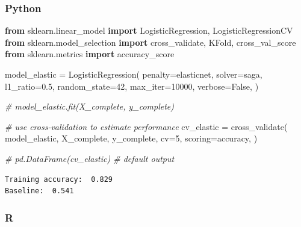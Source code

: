 \documentclass[
  letterpaper,
]{krantz}
\newenvironment{Shaded}{}{}
\newcommand{\CommentTok}[1]{\textcolor[rgb]{0.38,0.63,0.69}{\textit{#1}}}
\newcommand{\DecValTok}[1]{\textcolor[rgb]{0.25,0.63,0.44}{#1}}
\newcommand{\FloatTok}[1]{\textcolor[rgb]{0.25,0.63,0.44}{#1}}
\newcommand{\ImportTok}[1]{\textcolor[rgb]{0.00,0.50,0.00}{\textbf{#1}}}
\newcommand{\NormalTok}[1]{#1}
\newcommand{\OperatorTok}[1]{\textcolor[rgb]{0.40,0.40,0.40}{#1}}
\newcommand{\StringTok}[1]{\textcolor[rgb]{0.25,0.44,0.63}{#1}}
\newcommand{\VariableTok}[1]{\textcolor[rgb]{0.10,0.09,0.49}{#1}}
\begin{document}
\subsubsection{Python}

\begin{Shaded}
\begin{Highlighting}[]
\ImportTok{from}\NormalTok{ sklearn.linear\_model }\ImportTok{import}\NormalTok{ LogisticRegression, LogisticRegressionCV}
\ImportTok{from}\NormalTok{ sklearn.model\_selection }\ImportTok{import}\NormalTok{ cross\_validate, KFold, cross\_val\_score}
\ImportTok{from}\NormalTok{ sklearn.metrics }\ImportTok{import}\NormalTok{ accuracy\_score}


\NormalTok{model\_elastic }\OperatorTok{=}\NormalTok{ LogisticRegression(}
\NormalTok{    penalty}\OperatorTok{=}\StringTok{\textquotesingle{}elasticnet\textquotesingle{}}\NormalTok{,}
\NormalTok{    solver}\OperatorTok{=}\StringTok{\textquotesingle{}saga\textquotesingle{}}\NormalTok{,}
\NormalTok{    l1\_ratio}\OperatorTok{=}\FloatTok{0.5}\NormalTok{,}
\NormalTok{    random\_state}\OperatorTok{=}\DecValTok{42}\NormalTok{,}
\NormalTok{    max\_iter}\OperatorTok{=}\DecValTok{10000}\NormalTok{,}
\NormalTok{    verbose}\OperatorTok{=}\VariableTok{False}\NormalTok{,}
\NormalTok{)}

\CommentTok{\# model\_elastic.fit(X\_complete, y\_complete)}

 \CommentTok{\# use cross{-}validation to estimate performance}
\NormalTok{cv\_elastic }\OperatorTok{=}\NormalTok{ cross\_validate(}
\NormalTok{    model\_elastic,}
\NormalTok{    X\_complete,}
\NormalTok{    y\_complete,}
\NormalTok{    cv}\OperatorTok{=}\DecValTok{5}\NormalTok{,}
\NormalTok{    scoring}\OperatorTok{=}\StringTok{\textquotesingle{}accuracy\textquotesingle{}}\NormalTok{,}
\NormalTok{)}

\CommentTok{\# pd.DataFrame(cv\_elastic) \# default output}
\end{Highlighting}
\end{Shaded}

\begin{verbatim}
Training accuracy:  0.829 
Baseline:  0.541
\end{verbatim}

\subsubsection{R}
\end{document}
